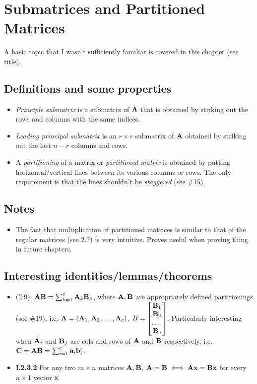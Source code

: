 \documentclass[a4paper, oneside]{book}
\begin{document}
\chapter{Submatrices and Partitioned Matrices}
A basic topic that I wasn't sufficiently familiar is covered in this chapter (see title). 

\section{Definitions and some properties}
\begin{itemize}
\item \textit{Principle submatrix} is a submatrix of $\mathbf A$ that is obtained by striking out the rows and columns with the same indices.
\item \textit{Leading principal submatrix} is an $r\times r$ submatrix of $\mathbf A$ obtained by striking out the last $n-r$ columns and rows.
\item A \textit{partitioning} of a matrix or \textit{partitioned matrix} is obtained by putting horizontal/vertical lines between its various columns or rows. The only requirement is that the lines shouldn't be \textit{staggered} (see \#15). 
\end{itemize}

\section*{Notes}
\begin{itemize}
\item The fact that multiplication of partitioned matrices is similar to that of the regular matrices (see 2.7) is very intuitive. Proves useful when proving thing in future chapters.
\end{itemize}

\section*{Interesting identities/lemmas/theorems}

\begin{itemize}
\item (2.9): $\mathbf{AB} = \sum_{k=1}^c \mathbf{A}_k \mathbf{B}_k$, where $\mathbf{A,B}$ are appropriately defined partitionings (see \#19), i.e. $\mathbf{A} = \left(\mathbf{A}_1, \mathbf{A}_2, \hdots, \mathbf{A}_c \right)$, $B=\begin{bmatrix} \mathbf{B}_1\\ \mathbf{B}_2\\ \hdots\ \\ \mathbf{B}_c \end{bmatrix}$. Particularly interesting when $\mathbf{A}_i$ and $\mathbf{B}_j$ are cols and rows of $\mathbf A$ and $\mathbf B$ respectively, i.e. $\mathbf{C}=\mathbf{A}\mathbf{B}=\sum_{i=1}^c \mathbf{a}_i\mathbf{b}'_i$.
\item \textbf{L2.3.2} For any two $m\times n$ matrices $ \mathbf{A,B}$, $\mathbf A = \mathbf B \iff \mathbf{Ax = Bx}$ for every $n\times 1$ vector $\mathbf x$
\end{itemize}
\end{document}
